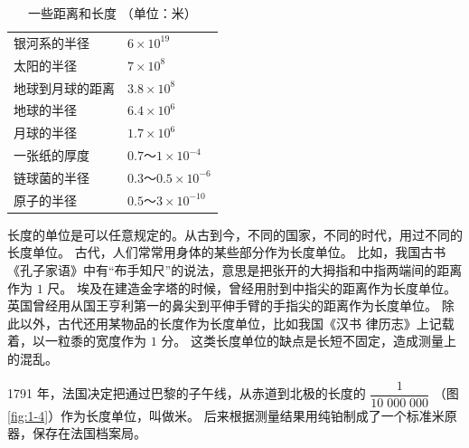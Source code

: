 \begin{table}[H]
    \centering
    \caption*{一些距离和长度 （单位：米）}
    \begin{tabular}{w{l}{10em}w{r}{8em}}
        银河系的半径        & $6 \times 10^{19}$ \\
        太阳的半径          & $7 \times 10^8$ \\
        地球到月球的距离    & $3.8 \times 10^8$ \\
        地球的半径          & $6.4 \times 10^6$ \\
        月球的半径          & $1.7 \times 10^6$ \\
        一张纸的厚度        & $0.7 \text{～} 1 \times 10^{-4}$\footnotemark \\
        链球菌的半径        & $0.3 \text{～} 0.5 \times 10^{-6}$ \\
        原子的半径          & $0.5 \text{～} 3 \times 10^{-10}$ \\
    \end{tabular}
\end{table}



长度的单位是可以任意规定的。从古到今，不同的国家，不同的时代，用过不同的长度单位。
古代，人们常常用身体的某些部分作为长度单位。
比如，我国古书《孔子家语》中有“布手知尺”的说法，意思是把张开的大拇指和中指两端间的距离作为 $1$ 尺。
埃及在建造金字塔的时候，曾经用肘到中指尖的距离作为长度单位。
英国曾经用从国王亨利第一的鼻尖到平伸手臂的手指尖的距离作为长度单位。
除此以外，古代还用某物品的长度作为长度单位，比如我国《汉书 \; 律历志》上记载着，以一粒黍的宽度作为 $1$ 分。
这类长度单位的缺点是长短不固定，造成测量上的混乱。

1791 年，法国决定把通过巴黎的子午线，从赤道到北极的长度的 $\dfrac{1}{10 \; 000 \; 000}$ （图 \ref{fig:1-4}）作为长度单位，叫做米。
后来根据测量结果用纯铂制成了一个标准米原器，保存在法国档案局。


